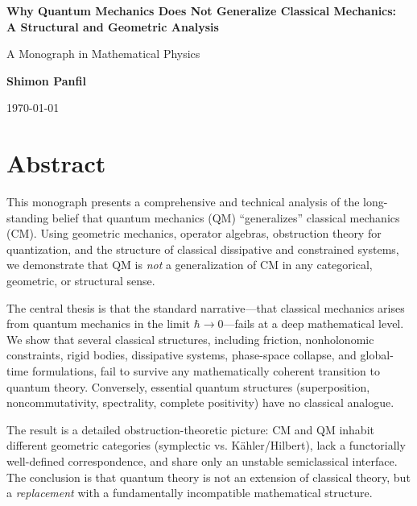 \documentclass[12pt,oneside]{book}
\theoremstyle{plain}
\theoremstyle{definition}
\begin{document}
\begin{titlepage}
\begin{center}
\vspace*{2cm}

\Huge
\textbf{Why Quantum Mechanics Does Not Generalize Classical Mechanics:\\
A Structural and Geometric Analysis}

\vspace{1cm}
\Large
A Monograph in Mathematical Physics

\vspace{2cm}

\large
\textbf{Shimon Panfil}

\vfill
\large
\today

\end{center}
\end{titlepage}

\frontmatter
\tableofcontents

\chapter*{Abstract}

This monograph presents a comprehensive and technical analysis of the long-standing belief
that quantum mechanics (QM) ``generalizes'' classical mechanics (CM).
Using geometric mechanics, operator algebras, obstruction theory for quantization,
and the structure of classical dissipative and constrained systems,
we demonstrate that QM is \emph{not} a generalization of CM in any categorical,
geometric, or structural sense.

The central thesis is that the standard narrative---that classical mechanics arises from quantum mechanics in the limit
$\hbar \to 0$---fails at a deep mathematical level. We show that several classical structures, including friction,
nonholonomic constraints, rigid bodies, dissipative systems, phase-space collapse, and global-time formulations,
fail to survive any mathematically coherent transition to quantum theory.
Conversely, essential quantum structures (superposition, noncommutativity, spectrality, complete positivity)
have no classical analogue.

The result is a detailed obstruction-theoretic picture: CM and QM inhabit different geometric categories
(symplectic vs. Kähler/Hilbert), lack a functorially well-defined correspondence,
and share only an unstable semiclassical interface.
The conclusion is that quantum theory is not an extension of classical theory,
but a \emph{replacement} with a fundamentally incompatible mathematical structure.
\end{document}

